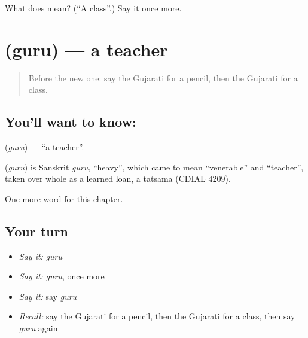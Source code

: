 \begin{tcolorbox}[breakable,colback=teal!4,colframe=teal!35!black,title={Before you move on}]
What does  mean? (\textquotedblleft{}A class\textquotedblright{}.) Say it once more.
\end{tcolorbox}
\section[\texorpdfstring{\gu{ગુરુ} (guru)}{ગુરુ (guru)}]{ (guru) — a teacher}

\label{lesson:GU-C130-guru}



\begin{quote}
Before the new one: say the Gujarati for a pencil, then the Gujarati for a class.
\end{quote}

\subsection*{You'll want to know: }
\textbf{} (\emph{guru}) — \textquotedblleft{}a teacher\textquotedblright{}.

\begin{cousinweb}
\textbf{} (\emph{guru}) is Sanskrit \emph{guru}, \textquotedblleft{}heavy\textquotedblright{}, which came to mean \textquotedblleft{}venerable\textquotedblright{} and \textquotedblleft{}teacher\textquotedblright{}, taken over whole as a learned loan, a tatsama (CDIAL 4209).
\end{cousinweb}

\begin{grammarlens}[title={What you've built}]
One more word for this chapter.
\end{grammarlens}

\subsection*{Your turn}
\begin{itemize}
\raggedright
  \item \emph{Say it:} \emph{guru}
  \item \emph{Say it:} \emph{guru}, once more
  \item \emph{Say it:} say \emph{guru}
  \item \emph{Recall:} say the Gujarati for a pencil, then the Gujarati for a class, then say \emph{guru} again
\end{itemize}

